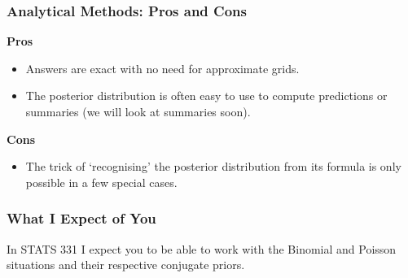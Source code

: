 \documentclass{beamer}
\begin{document}
\begin{frame}
\frametitle{Analytical Methods: Pros and Cons}

{\bf Pros}
\begin{itemize}
\item Answers are exact with no need for approximate grids.\pause
\item The posterior distribution is often easy to use to compute
    predictions or summaries (we will look at summaries soon).
\end{itemize}
\pause
{\bf Cons}
\begin{itemize}
\item The trick of `recognising' the posterior distribution from its formula
is only possible in a few special cases.
\end{itemize}


\end{frame}



\begin{frame}
\frametitle{What I Expect of You}
In STATS 331 I expect you to be able to work with the Binomial and
Poisson situations and their respective conjugate priors.

\end{frame}
\end{document}
